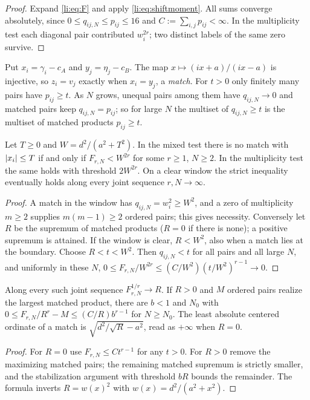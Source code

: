 \begin{proof}
Expand \eqref{li:eq:F} and apply \eqref{li:eq:shiftmoment}. All sums converge absolutely, since
$0\le q_{ij,N}\le p_{ij}\le16$ and $C:=\sum_{i,j}p_{ij}<\infty$. In the multiplicity test each
diagonal pair contributed $w_i^{2r}$; two distinct labels of the same zero survive.
\end{proof}

Put $x_i=\gamma_i-c_A$ and $y_j=\eta_j-c_B$. The map $x\mapsto(ix+a)/(ix-a)$ is injective, so
$z_i=v_j$ exactly when $x_i=y_j$, a \emph{match}. For $t>0$ only finitely many pairs have
$p_{ij}\ge t$. As $N$ grows, unequal pairs among them have $q_{ij,N}\to0$ and matched pairs keep
$q_{ij,N}=p_{ij}$; so for large $N$ the multiset of $q_{ij,N}\ge t$ is the multiset of matched
products $p_{ij}\ge t$.

\begin{theorem}\label{li:thm:match}
Let $T\ge0$ and $W=d^2/(a^2+T^2)$. In the mixed test there is no match with $\lvert x_i\rvert\le T$ if and
only if $F_{r,N}<W^{2r}$ for some $r\ge1$, $N\ge2$. In the multiplicity test the same holds with
threshold $2W^{2r}$. On a clear window the strict inequality eventually holds along every joint
sequence $r,N\to\infty$.
\end{theorem}

\begin{proof}
A match in the window has $q_{ij,N}=w_i^2\ge W^2$, and a zero of multiplicity $m\ge2$ supplies
$m(m-1)\ge2$ ordered pairs; this gives necessity. Conversely let $R$ be the supremum of matched
products ($R=0$ if there is none); a positive supremum is attained. If the window is clear,
$R<W^2$, also when a match lies at the boundary. Choose $R<t<W^2$. Then $q_{ij,N}<t$ for all pairs
and all large $N$, and uniformly in these $N$,
$0\le F_{r,N}/W^{2r}\le(C/W^2)(t/W^2)^{r-1}\to0$.
\end{proof}

\begin{corollary}\label{li:cor:match}
Along every such joint sequence $F_{r,N}^{1/r}\to R$. If $R>0$ and $M$ ordered pairs realize the
largest matched product, there are $b<1$ and $N_0$ with $0\le F_{r,N}/R^r-M\le(C/R)b^{r-1}$ for
$N\ge N_0$. The least absolute centered ordinate of a match is $\sqrt{d^2/\sqrt R-a^2}$, read as
$+\infty$ when $R=0$.
\end{corollary}

\begin{proof}
For $R=0$ use $F_{r,N}\le Ct^{r-1}$ for any $t>0$. For $R>0$ remove the maximizing matched pairs;
the remaining matched supremum is strictly smaller, and the stabilization argument with threshold
$bR$ bounds the remainder. The formula inverts $R=w(x)^2$ with $w(x)=d^2/(a^2+x^2)$.
\end{proof}


